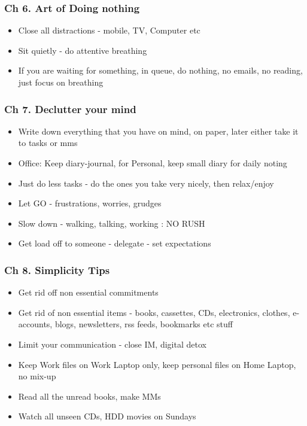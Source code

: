 \begin{frame}[fragile]
\frametitle{Ch 6. Art of Doing nothing}
\begin{itemize}[noitemsep,nolistsep]
\item Close all distractions - mobile, TV, Computer etc
\item Sit quietly - do attentive breathing
\item If you are waiting for something, in queue, do nothing, no emails, no reading, just focus on breathing
\end{itemize}
\end{frame}

\begin{frame}[fragile]
\frametitle{Ch 7. Declutter your mind}
\begin{itemize}[noitemsep,nolistsep]
\item Write down everything that you have on mind, on paper, later either take it to tasks or mms
\item Office: Keep diary-journal, for Personal, keep small diary for daily noting
\item Just do less tasks - do the ones you take very nicely, then relax/enjoy
\item Let GO - frustrations, worries, grudges
\item Slow down - walking, talking, working : NO RUSH
\item Get load off to someone - delegate - set expectations
\end{itemize}
\end{frame}

\begin{frame}[fragile]
\frametitle{Ch 8. Simplicity Tips}
\begin{itemize}[noitemsep,nolistsep]
\item Get rid off non essential commitments
\item Get rid of non essential items - books, cassettes, CDs, electronics, clothes, e-accounts, blogs, newsletters, rss feeds, bookmarks etc stuff
\item Limit your communication - close IM, digital detox
\item Keep Work files on Work Laptop only, keep personal files on Home Laptop, no mix-up
\item Read all the unread books, make MMs
\item Watch all unseen CDs, HDD movies on Sundays
\end{itemize}
\end{frame}

